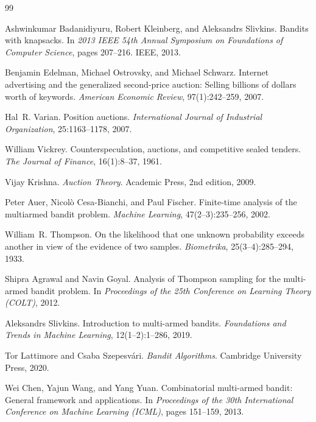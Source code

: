 \documentclass{article}
\theoremstyle{definition}
\theoremstyle{remark}
\begin{document}
\begin{thebibliography}{99}

Ashwinkumar Badanidiyuru, Robert Kleinberg, and Aleksandrs Slivkins.
\newblock Bandits with knapsacks.
\newblock In \emph{2013 IEEE 54th Annual Symposium on Foundations of Computer Science}, pages 207--216. IEEE, 2013.

Benjamin Edelman, Michael Ostrovsky, and Michael Schwarz.
\newblock Internet advertising and the generalized second-price auction: Selling billions of dollars worth of keywords.
\newblock \emph{American Economic Review}, 97(1):242--259, 2007.

Hal~R. Varian.
\newblock Position auctions.
\newblock \emph{International Journal of Industrial Organization}, 25:1163--1178, 2007.

William Vickrey.
\newblock Counterspeculation, auctions, and competitive sealed tenders.
\newblock \emph{The Journal of Finance}, 16(1):8--37, 1961.

Vijay Krishna.
\newblock \emph{Auction Theory}.
\newblock Academic Press, 2nd edition, 2009.

Peter Auer, Nicol{\`o} Cesa-Bianchi, and Paul Fischer.
\newblock Finite-time analysis of the multiarmed bandit problem.
\newblock \emph{Machine Learning}, 47(2--3):235--256, 2002.

William~R. Thompson.
\newblock On the likelihood that one unknown probability exceeds another in view of the evidence of two samples.
\newblock \emph{Biometrika}, 25(3--4):285--294, 1933.

Shipra Agrawal and Navin Goyal.
\newblock Analysis of {T}hompson sampling for the multi-armed bandit problem.
\newblock In \emph{Proceedings of the 25th Conference on Learning Theory (COLT)}, 2012.

Aleksandrs Slivkins.
\newblock Introduction to multi-armed bandits.
\newblock \emph{Foundations and Trends in Machine Learning}, 12(1--2):1--286, 2019.

Tor Lattimore and Csaba Szepesv{\'a}ri.
\newblock \emph{Bandit Algorithms}.
\newblock Cambridge University Press, 2020.

Wei Chen, Yajun Wang, and Yang Yuan.
\newblock Combinatorial multi-armed bandit: General framework and applications.
\newblock In \emph{Proceedings of the 30th International Conference on Machine Learning (ICML)}, pages 151--159, 2013.


\end{thebibliography}
\end{document}
